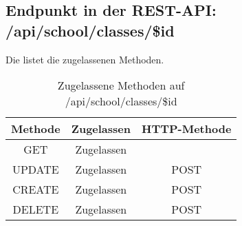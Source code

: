 \subsection{Endpunkt in der REST-API: /api/school/classes/\$id}
Die  listet die zugelassenen Methoden. 

\begin{table}[!htbp]
	\begin{tabular}{|c|c|c|}
		\hline
			\textbf{Methode} & \textbf{Zugelassen} & \textbf{HTTP-Methode} \\ \hline
			GET & Zugelassen &  \\ \hline
			UPDATE & Zugelassen & POST \\ \hline 
			CREATE & Zugelassen & POST \\ \hline 
			DELETE & Zugelassen & POST \\ \hline
	\end{tabular}

		\caption{Zugelassene Methoden auf /api/school/classes/\$id}
		\label{tab:end:rest:api:school:classes:id:meth}
\end{table}